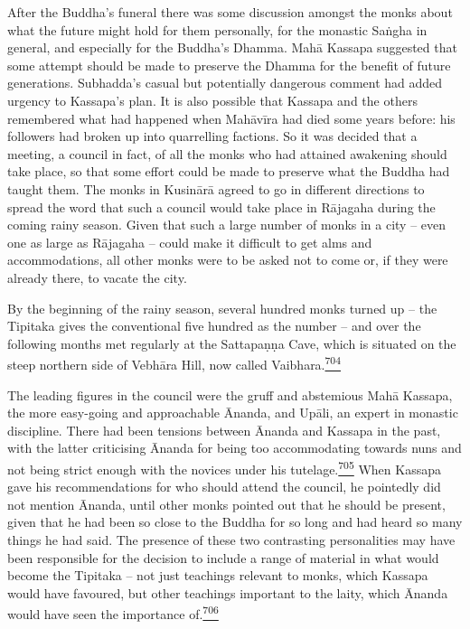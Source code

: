 After the Buddha's funeral there was some discussion amongst the monks
about what the future might hold for them personally, for the monastic
Saṅgha in general, and especially for the Buddha's Dhamma. Mahā Kassapa
suggested that some attempt should be made to preserve the Dhamma for
the benefit of future generations. Subhadda's casual but potentially
dangerous comment had added urgency to Kassapa's plan. It is also
possible that Kassapa and the others remembered what had happened when
Mahāvīra had died some years before: his followers had broken up into
quarrelling factions. So it was decided that a meeting, a council in
fact, of all the monks who had attained awakening should take place, so
that some effort could be made to preserve what the Buddha had taught
them. The monks in Kusinārā agreed to go in different directions to
spread the word that such a council would take place in Rājagaha during
the coming rainy season. Given that such a large number of monks in a
city -- even one as large as Rājagaha -- could make it difficult to get
alms and accommodations, all other monks were to be asked not to come
or, if they were already there, to vacate the city.

By the beginning of the rainy season, several hundred monks turned up --
the Tipitaka gives the conventional five hundred as the number -- and
over the following months met regularly at the Sattapaṇṇa Cave, which is
situated on the steep northern side of Vebhāra Hill, now called
Vaibhara.\label{footprints_split_018.html_fnref704}\hyperref[footprints_split_025.htmlux5cux23fn704]{\textsuperscript{704}}

The leading figures in the council were the gruff and abstemious Mahā
Kassapa, the more easy-going and approachable Ānanda, and Upāli, an
expert in monastic discipline. There had been tensions between Ānanda
and Kassapa in the past, with the latter criticising Ānanda for being
too accommodating towards nuns and not being strict enough with the
novices under his
tutelage.\label{footprints_split_018.html_fnref705}\hyperref[footprints_split_025.htmlux5cux23fn705]{\textsuperscript{705}}
When Kassapa gave his recommendations for who should attend the council,
he pointedly did not mention Ānanda, until other monks pointed out that
he should be present, given that he had been so close to the Buddha for
so long and had heard so many things he had said. The presence of these
two contrasting personalities may have been responsible for the decision
to include a range of material in what would become the Tipitaka -- not
just teachings relevant to monks, which Kassapa would have favoured, but
other teachings important to the laity, which Ānanda would have seen the
importance
of.\label{footprints_split_018.html_fnref706}\hyperref[footprints_split_025.htmlux5cux23fn706]{\textsuperscript{706}}


